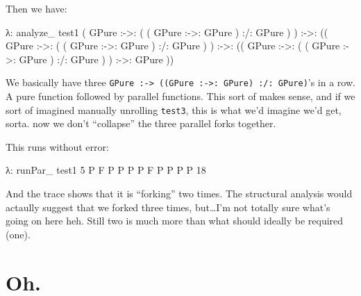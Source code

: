 \documentclass[]{article}
\newenvironment{Shaded}{}{}
\newcommand{\DataTypeTok}[1]{\textcolor[rgb]{0.56,0.13,0.00}{{#1}}}
\newcommand{\DecValTok}[1]{\textcolor[rgb]{0.25,0.63,0.44}{{#1}}}
\newcommand{\FunctionTok}[1]{\textcolor[rgb]{0.02,0.16,0.49}{{#1}}}
\newcommand{\NormalTok}[1]{{#1}}
\begin{document}
Then we have:

\begin{Shaded}
\begin{Highlighting}[]
\NormalTok{λ}\FunctionTok{:} \NormalTok{analyze_ test1}
\NormalTok{(}
  \DataTypeTok{GPure} \FunctionTok{:->:} \NormalTok{( ( }\DataTypeTok{GPure} \FunctionTok{:->:} \DataTypeTok{GPure} \NormalTok{) }\FunctionTok{:/:} \DataTypeTok{GPure} \NormalTok{)}
\NormalTok{) }\FunctionTok{:->:} \NormalTok{((}
  \DataTypeTok{GPure} \FunctionTok{:->:} \NormalTok{( ( }\DataTypeTok{GPure} \FunctionTok{:->:} \DataTypeTok{GPure} \NormalTok{) }\FunctionTok{:/:} \DataTypeTok{GPure} \NormalTok{)}
\NormalTok{) }\FunctionTok{:->:} \NormalTok{((}
  \DataTypeTok{GPure} \FunctionTok{:->:} \NormalTok{( ( }\DataTypeTok{GPure} \FunctionTok{:->:} \DataTypeTok{GPure} \NormalTok{) }\FunctionTok{:/:} \DataTypeTok{GPure} \NormalTok{)}
\NormalTok{) }\FunctionTok{:->:}
  \DataTypeTok{GPure}
\NormalTok{))}
\end{Highlighting}
\end{Shaded}

We basically have three
\texttt{GPure\ :-\textgreater{}\ ((GPure\ :-\textgreater{}:\ GPure)\ :/:\ GPure)}'s
in a row. A pure function followed by parallel functions. This sort of
makes sense, and if we sort of imagined manually unrolling
\texttt{test3}, this is what we'd imagine we'd get, sorta. now we don't
``collapse'' the three parallel forks together.

This runs without error:

\begin{Shaded}
\begin{Highlighting}[]
\NormalTok{λ}\FunctionTok{:} \NormalTok{runPar_ test1 }\DecValTok{5}
\DataTypeTok{P}
\DataTypeTok{F}
\DataTypeTok{P}
\DataTypeTok{P}
\DataTypeTok{P}
\DataTypeTok{P}
\DataTypeTok{F}
\DataTypeTok{P}
\DataTypeTok{P}
\DataTypeTok{P}
\DataTypeTok{P}
\DecValTok{18}
\end{Highlighting}
\end{Shaded}

And the trace shows that it is ``forking'' two times. The structural
analysis would actaully suggest that we forked three times,
but\ldots{}I'm not totally sure what's going on here heh. Still two is
much more than what should ideally be required (one).

\section{Oh.}\label{oh.}
\end{document}
